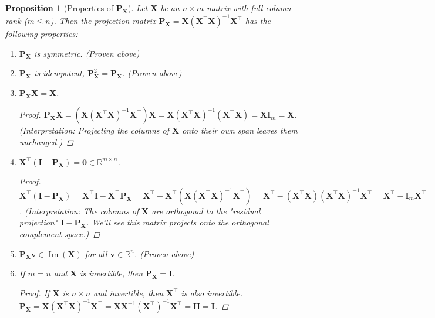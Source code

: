 \documentclass[11pt, a4paper]{article}
\DeclareMathOperator{\Image}{\mathrm{Im}}        %
\newtheorem{proposition}[theorem]{Proposition}
\theoremstyle{definition}
\theoremstyle{remark}
\newcommand{\RR}{\mathbb{R}}             %
\newcommand{\mat}[1]{\mathbf{#1}}       %
\newcommand{\vect}[1]{\bm{#1}}          %
\newcommand{\transpose}{^{\top}}        %
\begin{document}
\begin{proposition}[Properties of $\mat{P}_{\mat{X}}$]
\label{prop:Px_properties}
Let $\mat{X}$ be an $n \times m$ matrix with full column rank ($m \leq n$). Then the projection matrix $\mat{P}_{\mat{X}} = \mat{X}(\mat{X}\transpose \mat{X})^{-1}\mat{X}\transpose$ has the following properties:
\begin{enumerate}
    \item $\mat{P}_{\mat{X}}$ is symmetric. (Proven above)
    \item $\mat{P}_{\mat{X}}$ is idempotent, $\mat{P}_{\mat{X}}^2 = \mat{P}_{\mat{X}}$. (Proven above)
    \item $\mat{P}_{\mat{X}} \mat{X} = \mat{X}$.
        \begin{proof} $\mat{P}_{\mat{X}} \mat{X} = \left( \mat{X} (\mat{X}\transpose \mat{X})^{-1} \mat{X}\transpose \right) \mat{X} = \mat{X} (\mat{X}\transpose \mat{X})^{-1} (\mat{X}\transpose \mat{X}) = \mat{X} \mat{I}_m = \mat{X}$.
        (Interpretation: Projecting the columns of $\mat{X}$ onto their own span leaves them unchanged.)
        \end{proof}
    \item $\mat{X}\transpose (\mat{I} - \mat{P}_{\mat{X}}) = \mat{0} \in \RR^{m \times n}$.
        \begin{proof} $\mat{X}\transpose (\mat{I} - \mat{P}_{\mat{X}}) = \mat{X}\transpose \mat{I} - \mat{X}\transpose \mat{P}_{\mat{X}} = \mat{X}\transpose - \mat{X}\transpose (\mat{X} (\mat{X}\transpose \mat{X})^{-1} \mat{X}\transpose) = \mat{X}\transpose - (\mat{X}\transpose \mat{X}) (\mat{X}\transpose \mat{X})^{-1} \mat{X}\transpose = \mat{X}\transpose - \mat{I}_m \mat{X}\transpose = \mat{X}\transpose - \mat{X}\transpose = \mat{0}$.
        (Interpretation: The columns of $\mat{X}$ are orthogonal to the "residual projection" $\mat{I} - \mat{P}_{\mat{X}}$. We'll see this matrix projects onto the orthogonal complement space.)
        \end{proof}
    \item $\mat{P}_{\mat{X}} \vect{v} \in \Image(\mat{X})$ for all $\vect{v} \in \RR^n$. (Proven above)
    \item If $m=n$ and $\mat{X}$ is invertible, then $\mat{P}_{\mat{X}} = \mat{I}$.
        \begin{proof} If $\mat{X}$ is $n \times n$ and invertible, then $\mat{X}\transpose$ is also invertible.
        $\mat{P}_{\mat{X}} = \mat{X} (\mat{X}\transpose \mat{X})^{-1} \mat{X}\transpose = \mat{X} \mat{X}^{-1} (\mat{X}\transpose)^{-1} \mat{X}\transpose = \mat{I} \mat{I} = \mat{I}$.

\end{proof}
\end{enumerate}
\end{proposition}
\end{document}
